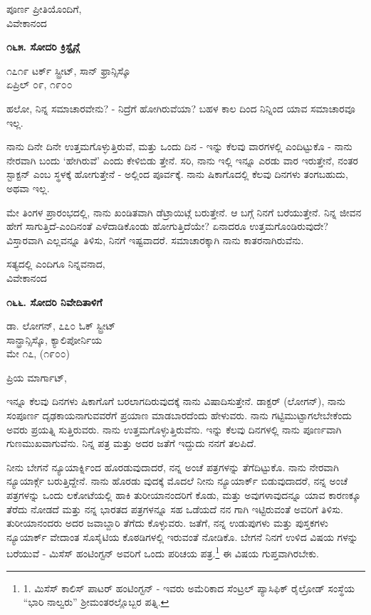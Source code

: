 \begin{flushright}
ಪೂರ್ಣ ಪ್ರೀತಿಯೊಂದಿಗೆ,\\ವಿವೇಕಾನಂದ
\end{flushright}

\begin{center}
\textbf{೧೬೫. ಸೋದರಿ ಕ್ರಿಸ್ಟೈನ್ಗೆ}
\end{center}

\begin{flushright}
೧೭೧೯ ಟರ್ಕ್ ಸ್ಟ್ರೀಟ್, ಸಾನ್ ಫ್ರಾನ್ಸಿಸ್ಕೊ\\ಏಪ್ರಿಲ್ ೦೯, ೧೯೦೦
\end{flushright}

ಹಲೋ, ನಿನ್ನ ಸಮಾಚಾರವೇನು? - ನಿದ್ರೆಗೆ ಹೋಗಿರುವೆಯಾ? ಬಹಳ ಕಾಲ ದಿಂದ ನಿನ್ನಿಂದ ಯಾವ ಸಮಾಚಾರವೂ ಇಲ್ಲ.

ನಾನು ದಿನೇ ದಿನೇ ಉತ್ತಮಗೊಳ್ಳುತ್ತಿರುವೆ, ಮತ್ತು ಒಂದು ದಿನ - ಇನ್ನು ಕೆಲವು ವಾರಗಳಲ್ಲಿ ಎಂದಿಟ್ಟುಕೊ - ನಾನು ನೇರವಾಗಿ ಬಂದು ‘ಹೇಗಿರುವೆ’ ಎಂದು ಕೇಳಿಬಿಡು ತ್ತೇನೆ. ಸರಿ, ನಾನು ಇಲ್ಲಿ ಇನ್ನೂ ಎರಡು ವಾರ ಇರುತ್ತೇನೆ, ನಂತರ ಸ್ಟಾಕ್ಟನ್ ಎಂಬ ಸ್ಥಳಕ್ಕೆ ಹೋಗುತ್ತೇನೆ - ಅಲ್ಲಿಂದ ಪೂರ್ವಕ್ಕೆ. ನಾನು ಷಿಕಾಗೊದಲ್ಲಿ ಕೆಲವು ದಿನಗಳು ತಂಗಬಹುದು, ಅಥವಾ ಇಲ್ಲ.

ಮೇ ತಿಂಗಳ ಪ್ರಾರಂಭದಲ್ಲಿ, ನಾನು ಖಂಡಿತವಾಗಿ ಡೆಟ್ರಾಯಿಟ್ಗೆ ಬರುತ್ತೇನೆ. ಆ ಬಗ್ಗೆ ನಿನಗೆ ಬರೆಯುತ್ತೇನೆ. ನಿನ್ನ ಜೀವನ ಹೇಗೆ ಸಾಗುತ್ತಿದೆ-ಎಂದಿನಂತೆ ಎಳೆದಾಡಿಕೊಂಡು ಹೋಗುತ್ತಿದೆಯೇ? ಏನಾದರೂ ಉತ್ತಮಗೊಂಡಿರುವುದೇ? ವಿಸ್ತಾರವಾಗಿ ಎಲ್ಲವನ್ನೂ ತಿಳಿಸು, ನಿನಗೆ ಇಷ್ಟವಾದರೆ. ಸಮಾಚಾರಕ್ಕಾಗಿ ನಾನು ಕಾತರನಾಗಿರುವೆನು.

\begin{flushright}
ಸತ್ಯದಲ್ಲಿ ಎಂದಿಗೂ ನಿನ್ನವನಾದ,\\ವಿವೇಕಾನಂದ
\end{flushright}

\begin{center}
\textbf{೧೬೬. ಸೋದರಿ ನಿವೇದಿತಾಳಿಗೆ}
\end{center}

\begin{flushright}
 ಡಾ. ಲೋಗನ್, ೭೭೦ ಓಕ್ ಸ್ಟ್ರೀಟ್\\ಸಾನ್ಫ್ರಾನ್ಸಿಸ್ಕೊ, ಕ್ಯಾಲಿಪೋರ್ನಿಯ\\ಮೇ ೧೭, (೧೯೦೦)
\end{flushright}

ಪ್ರಿಯ ಮಾರ್ಗಾಟ್,

ಇನ್ನೂ ಕೆಲವು ದಿನಗಳು ಷಿಕಾಗೊಗೆ ಬರಲಾಗದಿರುವುದಕ್ಕೆ ನಾನು ವಿಷಾದಿಸುತ್ತೇನೆ. ಡಾಕ್ಟರ್ (ಲೋಗನ್), ನಾನು ಸಂಪೂರ್ಣ ದೃಢಕಾಯನಾಗುವವರೆಗೆ ಪ್ರಯಾಣ ಮಾಡಬಾರದೆಂದು ಹೇಳುವರು. ನಾನು ಗಟ್ಟಿಮುಟ್ಟಾಗಲೇಬೇಕೆಂದು ಅವರು ಪ್ರಯತ್ನಿ ಸುತ್ತಿರುವರು. ನಾನು ಉತ್ತಮಗೊಳ್ಳುತ್ತಿರುವೆನು. ಇನ್ನು ಕೆಲವು ದಿನಗಳಲ್ಲಿ ನಾನು ಪೂರ್ಣವಾಗಿ ಗುಣಮುಖವಾಗುವೆನು. ನಿನ್ನ ಪತ್ರ ಮತ್ತು ಅದರ ಜತೆಗೆ ಇದ್ದುದು ನನಗೆ ತಲಪಿದೆ.

ನೀನು ಬೇಗನೆ ನ್ಯೂಯಾರ್ಕ್ನಿಂದ ಹೊರಡುವುದಾದರೆ, ನನ್ನ ಅಂಚೆ ಪತ್ರಗಳನ್ನು ತೆಗೆದಿಟ್ಟುಕೊ. ನಾನು ನೇರವಾಗಿ ನ್ಯೂಯಾರ್ಕ್ಗೆ ಬರುತ್ತಿದ್ದೇನೆ. ನಾನು ಹೊರಡು ವುದಕ್ಕೆ ಮೊದಲೆ ನೀನು ನ್ಯೂಯಾರ್ಕ್ ಬಿಡುವುದಾದರೆ, ನನ್ನ ಅಂಚೆ ಪತ್ರಗಳನ್ನು ಒಂದು ಲಕೋಟೆಯಲ್ಲಿ ಹಾಕಿ ತುರೀಯಾನಂದರಿಗೆ ಕೊಡು, ಮತ್ತು ಅವುಗಳಾವುದನ್ನೂ ಯಾವ ಕಾರಣಕ್ಕೂ ತೆರೆದು ನೋಡದೆ ಮತ್ತು ನನ್ನ ಭಾರತದ ಪತ್ರಗಳನ್ನೂ ಸಹ ಒಡೆಯದೆ ನನ ಗಾಗಿ ಇಟ್ಟಿರುವಂತೆ ಅವರಿಗೆ ತಿಳಿಸು. ತುರೀಯಾನಂದರು ಅದರ ಜವಾಬ್ದಾರಿ ತೆಗೆದು ಕೊಳ್ಳುವರು. ಜತೆಗೆ, ನನ್ನ ಉಡುಪುಗಳು ಮತ್ತು ಪುಸ್ತಕಗಳು ನ್ಯೂಯಾರ್ಕ್ ವೇದಾಂತ ಸೊಸೈಟಿಯ ಕೊಠಡಿಗಳಲ್ಲಿ ಇರುವಂತೆ ನೋಡಿಕೊ. ಬೇಗನೆ ನಿನಗೆ ಉಳಿದ ವಿಷಯ ಗಳನ್ನು ಬರೆಯುವೆ - ಮಿಸೆಸ್ ಹಂಟಿಂಗ್ಟನ್ ಅವರಿಗೆ ಒಂದು ಪರಿಚಯ ಪತ್ರ.\footnote{1. ಮಿಸೆಸ್ ಕಾಲಿಸ್ ಪಾಟರ್ ಹಂಟಿಂಗ್ಟನ್ - ಇವರು ಅಮೆರಿಕಾದ ಸೆಂಟ್ರಲ್ ಪ್ಯಾಸಿಫಿಕ್ ರೈಲ್ರೋಡ್ ಸಂಸ್ಥೆಯ “ಭಾರಿ ನಾಲ್ವರು” ಶ‍್ರೀಮಂತರಲ್ಲೊಬ್ಬರ ಪತ್ನಿ.} ಈ ವಿಷಯ ಗುಪ್ತವಾಗಿರಬೇಕು.

